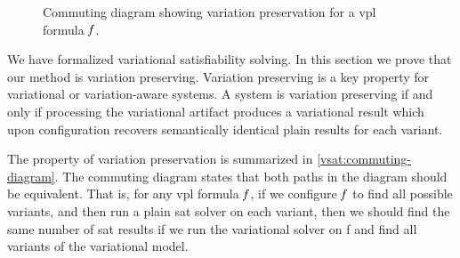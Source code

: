 \label{section:vsat:variation-preservation}
%
\begin{figure}[h]
  \centering
  
  \caption{Commuting diagram showing variation preservation for a \ac{vpl}
    formula $\mathit{f}$.}%
  \label{vsat:commuting-diagram}
\end{figure}
We have formalized variational satisfiability solving. In this section we prove
that our method is variation preserving. Variation preserving is a key property
for variational or variation-aware systems. A system is variation preserving if
and only if processing the variational artifact produces a variational result
which upon configuration recovers semantically identical plain results for each
variant.

The property of variation preservation is summarized in
\autoref{vsat:commuting-diagram}. The commuting diagram states that both paths
in the diagram should be equivalent. That is, for any \ac{vpl} formula $\mathit{f}$,
if we configure $\mathit{f}$ to find all possible variants, and then run a plain
\ac{sat} solver on each variant, then we should find the same number of \ac{sat}
results if we run the variational solver on \ac{f} and find all variants of the
variational model.
